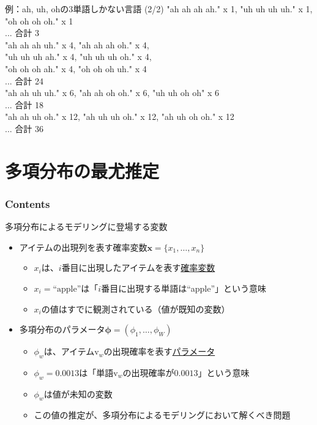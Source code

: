 \documentclass[aspectratio=169,unicode,dvipdfmx,14pt]{beamer}
\begin{document}
\begin{frame}{例：ah, uh, ohの3単語しかない言語 (2/2)}
\small
"ah ah ah ah." x 1, "uh uh uh uh." x 1, "oh oh oh oh." x 1 \\
... 合計 3\\
"ah ah ah uh." x 4, "ah ah ah oh." x 4, \\
"uh uh uh ah." x 4, "uh uh uh oh." x 4, \\
"oh oh oh ah." x 4, "oh oh oh uh." x 4 \\
... 合計 24\\
"ah ah uh uh." x 6, "ah ah oh oh." x 6, "uh uh oh oh" x 6 \\
... 合計 18\\
"ah ah uh oh." x 12, "ah uh uh oh." x 12, "ah uh oh oh." x 12 \\
... 合計 36
\end{frame}


\section{多項分布の最尤推定}

\begin{frame}\frametitle{Contents}
\Large \tableofcontents[currentsection]
\end{frame}

\begin{frame}{多項分布によるモデリングに登場する変数}
\begin{itemize}
\item アイテムの出現列を表す確率変数$\bm{x}=\{x_1,\ldots,x_n\}$
\begin{itemize}
\item $x_i$は、$i$番目に出現したアイテムを表す\underline{確率変数}
\item[例.] $x_i = \mbox{``apple''}$は「$i$番目に出現する単語は``apple''」という意味
\item $x_i$の値はすでに観測されている（値が既知の変数）
\end{itemize}
\item 多項分布のパラメータ$\bm{\phi}=(\phi_1,\ldots,\phi_W)$
\begin{itemize}
\item $\phi_w$は、アイテム$\mbox{v}_w$の出現確率を表す\underline{パラメータ}
\item[例.] $\phi_w=0.0013$は「単語$\mbox{v}_w$の出現確率が$0.0013$」という意味
\item $\phi_w$は値が未知の変数
\item この値の推定が、多項分布によるモデリングにおいて解くべき問題
\end{itemize}
\end{itemize}
\end{frame}
\end{document}
